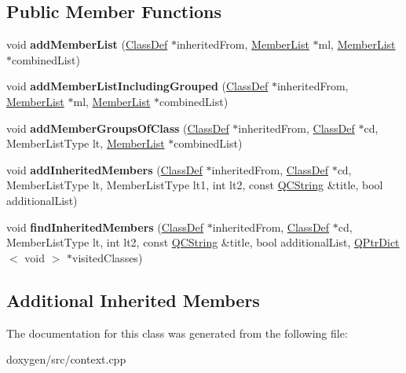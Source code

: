 \subsection*{Public Member Functions}
\begin{DoxyCompactItemize}
\item 
\mbox{\label{class_inherited_member_info_list_context_1_1_private_a0857df88d1a6bb960bebce65eb0f7cb7}} 
void {\bfseries add\+Member\+List} (\mbox{\hyperlink{class_class_def}{Class\+Def}} $\ast$inherited\+From, \mbox{\hyperlink{class_member_list}{Member\+List}} $\ast$ml, \mbox{\hyperlink{class_member_list}{Member\+List}} $\ast$combined\+List)
\item 
\mbox{\label{class_inherited_member_info_list_context_1_1_private_a81629ce8656c02c85ca33400db66a452}} 
void {\bfseries add\+Member\+List\+Including\+Grouped} (\mbox{\hyperlink{class_class_def}{Class\+Def}} $\ast$inherited\+From, \mbox{\hyperlink{class_member_list}{Member\+List}} $\ast$ml, \mbox{\hyperlink{class_member_list}{Member\+List}} $\ast$combined\+List)
\item 
\mbox{\label{class_inherited_member_info_list_context_1_1_private_a91f0382e83503c98dfe9f08574f269d7}} 
void {\bfseries add\+Member\+Groups\+Of\+Class} (\mbox{\hyperlink{class_class_def}{Class\+Def}} $\ast$inherited\+From, \mbox{\hyperlink{class_class_def}{Class\+Def}} $\ast$cd, Member\+List\+Type lt, \mbox{\hyperlink{class_member_list}{Member\+List}} $\ast$combined\+List)
\item 
\mbox{\label{class_inherited_member_info_list_context_1_1_private_ad9abba0149a9bad4928c6c52b878a4de}} 
void {\bfseries add\+Inherited\+Members} (\mbox{\hyperlink{class_class_def}{Class\+Def}} $\ast$inherited\+From, \mbox{\hyperlink{class_class_def}{Class\+Def}} $\ast$cd, Member\+List\+Type lt, Member\+List\+Type lt1, int lt2, const \mbox{\hyperlink{class_q_c_string}{Q\+C\+String}} \&title, bool additional\+List)
\item 
\mbox{\label{class_inherited_member_info_list_context_1_1_private_a0083eb0644b03f1801aa80ea3c250735}} 
void {\bfseries find\+Inherited\+Members} (\mbox{\hyperlink{class_class_def}{Class\+Def}} $\ast$inherited\+From, \mbox{\hyperlink{class_class_def}{Class\+Def}} $\ast$cd, Member\+List\+Type lt, int lt2, const \mbox{\hyperlink{class_q_c_string}{Q\+C\+String}} \&title, bool additional\+List, \mbox{\hyperlink{class_q_ptr_dict}{Q\+Ptr\+Dict}}$<$ void $>$ $\ast$visited\+Classes)
\end{DoxyCompactItemize}
\subsection*{Additional Inherited Members}


The documentation for this class was generated from the following file\+:\begin{DoxyCompactItemize}
\item 
doxygen/src/context.\+cpp\end{DoxyCompactItemize}
